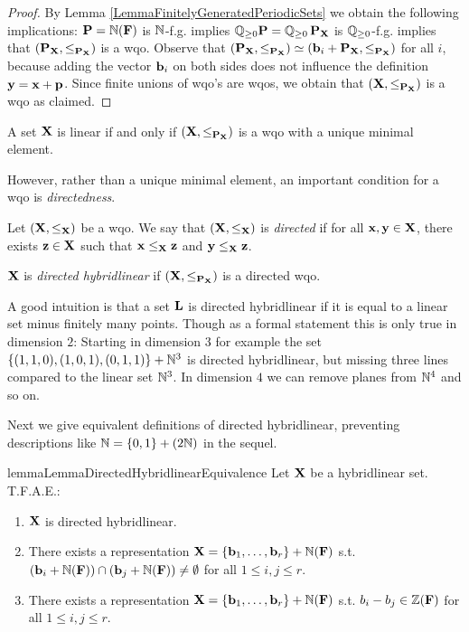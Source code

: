 \begin{proof}
By Lemma \ref{LemmaFinitelyGeneratedPeriodicSets} we obtain the following implications: \(\mathbf{P}=\mathbb{N}(\mathbf{F})\) is \(\mathbb{N}\)-f.g. implies \(\mathbb{Q}_{\geq 0}\mathbf{P}=\mathbb{Q}_{\geq 0} \operatorname{\mathbf{P}_{\mathbf{X}}}\) is \(\mathbb{Q}_{\geq 0}\)-f.g. implies that \((\operatorname{\mathbf{P}_{\mathbf{X}}}, \leq_{\operatorname{\mathbf{P}_{\mathbf{X}}}})\) is a wqo. Observe that \((\operatorname{\mathbf{P}_{\mathbf{X}}}, \leq_{\operatorname{\mathbf{P}_{\mathbf{X}}}}) \simeq (\mathbf{b}_i+\operatorname{\mathbf{P}_{\mathbf{X}}}, \leq_{\operatorname{\mathbf{P}_{\mathbf{X}}}})\) for all \(i\), because adding the vector \(\mathbf{b}_i\) on both sides does not influence the definition \(\mathbf{y}=\mathbf{x}+\mathbf{p}\). Since finite unions of wqo's are wqos, we obtain that \((\mathbf{X}, \leq_{\operatorname{\mathbf{P}_{\mathbf{X}}}})\) is a wqo as claimed.
\end{proof}

\begin{corollary}
A set \(\mathbf{X}\) is linear if and only if \((\mathbf{X}, \leq_{\operatorname{\mathbf{P}_{\mathbf{X}}}})\) is a wqo with a unique minimal element.
\end{corollary}

However, rather than a unique minimal element, an important condition for a wqo is \emph{directedness}.

\begin{definition}
Let \((\mathbf{X}, \leq_{\mathbf{X}})\) be a wqo. We say that \((\mathbf{X}, \leq_{\mathbf{X}})\) is \emph{directed} if for all \(\mathbf{x},\mathbf{y} \in \mathbf{X}\), there exists \(\mathbf{z} \in \mathbf{X}\) such that \(\mathbf{x} \leq_{\mathbf{X}} \mathbf{z}\) and \(\mathbf{y} \leq_{\mathbf{X}} \mathbf{z}\). 

\(\mathbf{X}\) is \emph{directed hybridlinear} if \((\mathbf{X}, \leq_{\operatorname{\mathbf{P}_{\mathbf{X}}}})\) is a directed wqo.
\end{definition}

A good intuition is that a set \(\mathbf{L}\) is directed hybridlinear if it is equal to a linear set minus finitely many points. Though as a formal statement this is only true in dimension \(2\): Starting in dimension \(3\) for example the set \(\{(1,1,0), (1,0,1),(0,1,1)\}+\mathbb{N}^3\) is directed hybridlinear, but missing three lines compared to the linear set \(\mathbb{N}^3\). In dimension \(4\) we can remove planes from \(\mathbb{N}^4\) and so on.

Next we give equivalent definitions of directed hybridlinear, preventing descriptions like \(\mathbb{N}=\{0,1\}+(2\mathbb{N})\) in the sequel.

\begin{restatable}{lemma}{LemmaDirectedHybridlinearEquivalence}\label{LemmaDirectedHybridlinearEquivalence}
Let \(\mathbf{X}\) be a hybridlinear set. T.F.A.E.:
\begin{enumerate}
\item \(\mathbf{X}\) is directed hybridlinear.
\item There exists a representation \(\mathbf{X}=\{\mathbf{b}_1, \dots, \mathbf{b}_r\}+\mathbb{N}(\mathbf{F})\) s.t. \((\mathbf{b}_i+\mathbb{N}(\mathbf{F})) \cap (\mathbf{b}_j+\mathbb{N}(\mathbf{F})) \neq \emptyset\) for all \(1 \leq i,j \leq r\).
\item There exists a representation \(\mathbf{X}=\{\mathbf{b}_1, \dots, \mathbf{b}_r\}+\mathbb{N}(\mathbf{F})\) s.t. \(b_i-b_j \in \mathbb{Z}(\mathbf{F})\) for all \(1 \leq i,j \leq r\).
\end{enumerate}
\end{restatable}

